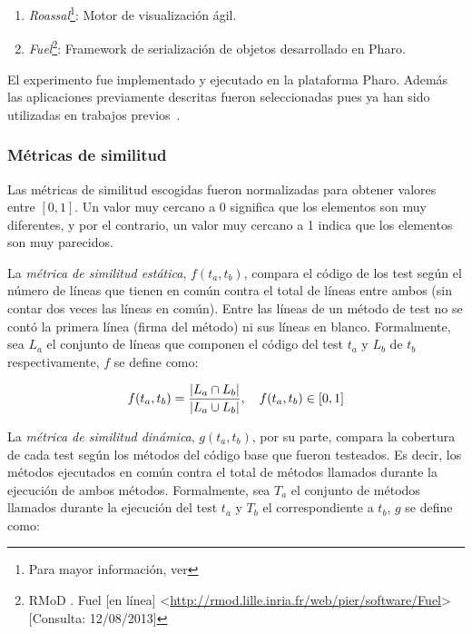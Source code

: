 \begin{enumerate} 
\item \emph{Roassal}\footnote{Para mayor información, ver }: Motor de visualización ágil.
\item \emph{Fuel}\footnote{RMoD . Fuel [en línea] \textless\url{http://rmod.lille.inria.fr/web/pier/software/Fuel}\textgreater [Consulta: 12/08/2013] }: Framework de serialización de objetos desarrollado en Pharo.
\end{enumerate}

\par El experimento fue implementado y ejecutado en la plataforma Pharo. Además las aplicaciones previamente descritas fueron seleccionadas pues ya han sido utilizadas en trabajos previos~\cite{Berg11d}.

\subsubsection{Métricas de similitud}
\par Las métricas de similitud escogidas fueron normalizadas para obtener valores entre $\left[ 0 , 1 \right]$. Un valor muy cercano a $0$ significa que los elementos son muy diferentes, y por el contrario, un valor muy cercano a 1 indica que los elementos son muy parecidos. 

\par La \emph{métrica de similitud estática}, $f(t_a,t_b)$, compara el código de los test según el número de líneas que tienen en común contra el total de líneas entre ambos (sin contar dos veces las líneas en común). Entre las líneas de un método de test no se contó la primera línea (firma del método) ni sus líneas en blanco. Formalmente, sea $L_{a}$ el conjunto de líneas que componen el código del test $t_a$ y  $L_{b}$ de $t_b$ respectivamente, $f$ se define como: 

\[ f(t_a,t_b)= \dfrac{\vert L_{a} \cap L_{b} \vert}{\vert L_{a} \cup L_{b} \vert} , \quad f(t_a,t_b) \in \left[ 0 , 1 \right] \]

\par La \emph{métrica de similitud dinámica}, $g(t_a,t_b)$, por su parte, compara la cobertura de cada test según los métodos del código base que fueron testeados. Es decir, los métodos ejecutados en común contra el total de métodos llamados durante la ejecución de ambos métodos. Formalmente, sea $T_{a}$ el conjunto de métodos llamados durante la ejecución del test $t_a$ y $T_{b}$ el correspondiente a $t_b$, $g$ se define como: 

